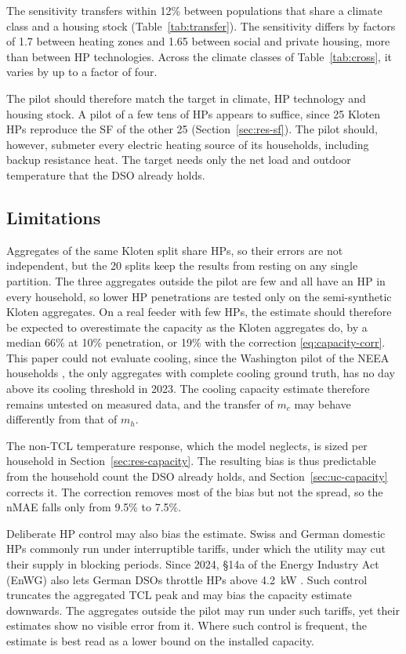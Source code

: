 The sensitivity transfers within 12\% between populations that share a climate class and a housing stock (Table~\ref{tab:transfer}). The sensitivity differs by factors of 1.7 between heating zones and 1.65 between social and private housing, more than between HP technologies. Across the climate classes of Table~\ref{tab:cross}, it varies by up to a factor of four.

The pilot should therefore match the target in climate, HP technology and housing stock. A pilot of a few tens of HPs appears to suffice, since 25 Kloten HPs reproduce the SF of the other 25 (Section~\ref{sec:res-sf}). The pilot should, however, submeter every electric heating source of its households, including backup resistance heat. The target needs only the net load and outdoor temperature that the DSO already holds.

\subsection{Limitations}

Aggregates of the same Kloten split share HPs, so their errors are not independent, but the 20 splits keep the results from resting on any single partition. The three aggregates outside the pilot are few and all have an HP in every household, so lower HP penetrations are tested only on the semi-synthetic Kloten aggregates. On a real feeder with few HPs, the estimate should therefore be expected to overestimate the capacity as the Kloten aggregates do, by a median 66\% at 10\% penetration, or 19\% with the correction \eqref{eq:capacity-corr}. This paper could not evaluate cooling, since the Washington pilot of the NEEA households \cite{neea_eulr}, the only aggregates with complete cooling ground truth, has no day above its cooling threshold in 2023. The cooling capacity estimate therefore remains untested on measured data, and the transfer of $m_c$ may behave differently from that of $m_h$.

The non-TCL temperature response, which the model neglects, is sized per household in Section~\ref{sec:res-capacity}. The resulting bias is thus predictable from the household count the DSO already holds, and Section~\ref{sec:uc-capacity} corrects it. The correction removes most of the bias but not the spread, so the nMAE falls only from 9.5\% to 7.5\%.

Deliberate HP control may also bias the estimate. Swiss and German domestic HPs commonly run under interruptible tariffs, under which the utility may cut their supply in blocking periods. Since 2024, {\S}14a of the Energy Industry Act (EnWG) also lets German DSOs throttle HPs above 4.2~kW \cite{Bna23}. Such control truncates the aggregated TCL peak and may bias the capacity estimate downwards. The aggregates outside the pilot may run under such tariffs, yet their estimates show no visible error from it. Where such control is frequent, the estimate is best read as a lower bound on the installed capacity.

